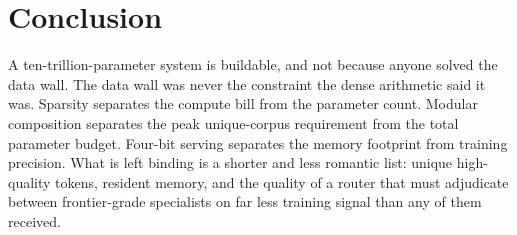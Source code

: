 \documentclass[11pt]{article}
\begin{document}
\section{Conclusion}

A ten-trillion-parameter system is buildable, and not because anyone solved the data wall. The data wall was never the constraint the dense arithmetic said it was. Sparsity separates the compute bill from the parameter count. Modular composition separates the peak unique-corpus requirement from the total parameter budget. Four-bit serving separates the memory footprint from training precision. What is left binding is a shorter and less romantic list: unique high-quality tokens, resident memory, and the quality of a router that must adjudicate between frontier-grade specialists on far less training signal than any of them received.
\end{document}
